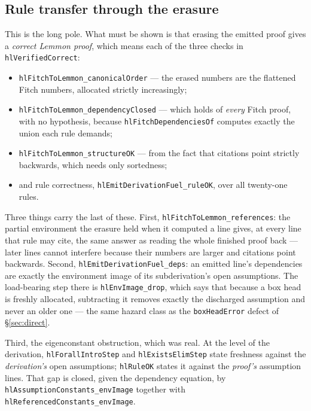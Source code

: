 \documentclass[11pt]{article}
\theoremstyle{plain}
\newcommand{\ubrk}{\_\discretionary{}{}{}}
\newcommand{\isa}[1]{\textup{\texttt{\small #1}}}
\begin{document}
\subsection{Rule transfer through the erasure}
This is the long pole. What must be shown is that erasing the emitted proof
gives a \emph{correct Lemmon proof}, which means each of the three checks in
\isa{hlVerifiedCorrect}:

\begin{itemize}
\item \isa{hlFitchToLemmon\ubrk{}canonicalOrder} --- the erased numbers are the
  flattened Fitch numbers, allocated strictly increasingly;
\item \isa{hlFitchToLemmon\ubrk{}dependencyClosed} --- which holds of \emph{every}
  Fitch proof, with no hypothesis, because \isa{hlFitchDependenciesOf} computes
  exactly the union each rule demands;
\item \isa{hlFitchToLemmon\ubrk{}structureOK} --- from the fact that citations point
  strictly backwards, which needs only sortedness;
\item and rule correctness, \isa{hlEmitDerivationFuel\ubrk{}ruleOK}, over all
  twenty-one rules.
\end{itemize}

Three things carry the last of these. First,
\isa{hlFitchToLemmon\ubrk{}references}: the partial environment the erasure held when
it computed a line gives, at every line that rule may cite, the same answer as
reading the whole finished proof back --- later lines cannot interfere because
their numbers are larger and citations point backwards. Second,
\isa{hlEmitDerivationFuel\ubrk{}deps}: an emitted line's dependencies are exactly the
environment image of its subderivation's open assumptions. The load-bearing
step there is \isa{hlEnvImage\ubrk{}drop}, which says that because a box head is
freshly allocated, subtracting it removes exactly the discharged assumption and
never an older one --- the same hazard class as the \isa{boxHeadError} defect of
\S\ref{sec:direct}.

Third, the eigenconstant obstruction, which was real. At the level of the
derivation, \isa{hlForallIntroStep} and \isa{hlExistsElimStep} state freshness
against the \emph{derivation's} open assumptions; \isa{hlRuleOK} states it against the
\emph{proof's} assumption lines. That gap is closed, given the dependency
equation, by \isa{hlAssumptionConstants\ubrk{}envImage} together with
\isa{hlReferencedConstants\ubrk{}envImage}.
\end{document}
